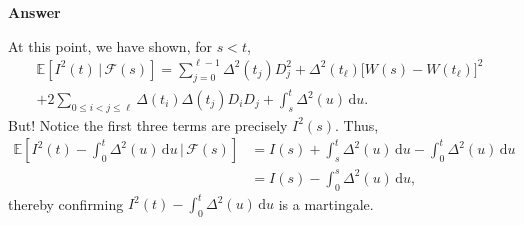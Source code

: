 \documentclass[11pt]{article}
\newcommand\E{\mathbb{E}}
\newcommand\cF{\mathcal{F}}
\newenvironment{hwanswer}
    {
        \vspace{2mm}
        {\bfseries Answer}
        \vspace{-\abovedisplayskip}
        \begin{center}
            \begin{tcolorbox}[
                width=0.95\textwidth,
                colback=white,
                colframe=white,
                opacityback=0,
                opacityframe=0,
                boxrule=0pt,
                frame hidden,
                breakable,
                before upper={\parindent15pt} %
            ]
            \lineskip=0pt %
    }
    {
        \end{tcolorbox}
        \end{center}
        \vspace{4mm}
    }
\begin{document}
\begin{hwanswer}
\begin{enumerate}[(i)]
            At this point, we have shown, for $s < t$,
            \[
                \begin{multlined}
                    \E\left[
                        I^2(t)
                        \, | \,
                        \cF(s)
                    \right]
                    =
                    \sum_{j=0}^{\ell-1}
                    \Delta^2(t_j) D_{j}^2
                    +
                    \Delta^2(t_{\ell}) \big[ W(s) - W(t_{\ell}) \big]^2
                    \\
                    +
                    2 \sum_{0 \leq i < j \leq \ell}
                    \Delta(t_i) \Delta(t_j)
                    D_i D_j
                    +
                    \int_{s}^{t} \Delta^2(u) \, \text{d} u.
                \end{multlined}
            \]
            But! Notice the first three terms are precisely $I^2(s)$. Thus,
            \[
                \begin{aligned}
                    \E\left[
                        I^2(t) - \int_{0}^{t} \Delta^2(u) \, \text{d} u
                        \, \bigg| \,
                        \cF(s)
                    \right]
                    &=
                    I(s) + \int_{s}^{t} \Delta^2(u) \, \text{d} u
                    -
                    \int_{0}^{t} \Delta^2(u) \, \text{d} u
                    \\
                    &=
                    I(s) - \int_{0}^{s} \Delta^2(u) \, \text{d} u,
                \end{aligned}
            \]
            thereby confirming $I^2(t) - \int_{0}^{t} \Delta^2(u) \, \text{d} u$ is a
            martingale.

            \vspace{1cm}


\end{enumerate}
\end{hwanswer}
\end{document}
